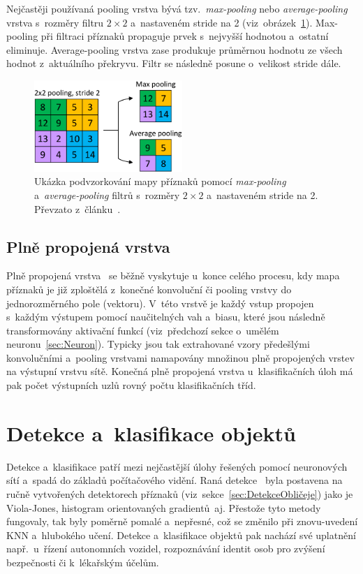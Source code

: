 Nejčastěji používaná pooling vrstva bývá tzv.~\emph{max-pooling} nebo \emph{average-pooling} vrstva s~rozměry filtru $2 \times 2$ a~nastaveném stride na 2 (viz~obrázek~\ref{img:pooling}). Max-pooling při filtraci příznaků propaguje prvek s~nejvyšší hodnotou a~ostatní eliminuje. Average-pooling vrstva zase produkuje průměrnou hodnotu ze všech hodnot z~aktuálního překryvu. Filtr se následně posune o~velikost stride dále.

\begin{figure}[hbt]
	\centering
	\setlength{\fboxsep}{0pt}
	\includegraphics[width=0.5\textwidth]{obrazky-figures/pooling.pdf}
	\caption{Ukázka podvzorkování mapy příznaků pomocí \emph{max-pooling} a~\emph{average-pooling} filtrů s~rozměry $2 \times 2$ a~nastaveném stride na 2. Převzato z~článku~\cite{website:CNNOverviewAndApplication}.}
	\label{img:pooling}
\end{figure}

\subsection{Plně propojená vrstva}
Plně propojená vrstva~\cite{website:CNNOverviewAndApplication} se běžně vyskytuje u~konce celého procesu, kdy mapa příznaků je již zploštělá z~konečné konvoluční či pooling vrstvy do jednorozměrného pole (vektoru). V~této vrstvě je každý vstup propojen s~každým výstupem pomocí naučitelných vah a~biasu, které jsou následně transformovány aktivační funkcí (viz~předchozí sekce o~umělém neuronu~\ref{sec:Neuron}). Typicky jsou tak extrahované vzory předešlými konvolučními a~pooling vrstvami namapovány množinou plně propojených vrstev na výstupní vrstvu sítě. Konečná plně propojená vrstva u~klasifikačních úloh má pak počet výstupních uzlů rovný počtu klasifikačních tříd.

\section{Detekce a~klasifikace objektů}
Detekce a~klasifikace patří mezi nejčastější úlohy řešených pomocí neuronových sítí a~spadá do základů počítačového vidění. Raná detekce~\cite{article:SurveyOfObjectDetection} byla postavena na ručně vytvořených detektorech příznaků (viz~sekce~\ref{sec:DetekceObličeje}) jako je Viola-Jones, histogram orientovaných gradientů~aj. Přestože tyto metody fungovaly, tak byly poměrně pomalé a~nepřesné, což se změnilo při znovu-uvedení KNN a~hlubokého učení. Detekce a~klasifikace objektů pak nachází své uplatnění např.~u~řízení autonomních vozidel, rozpoznávání identit osob pro zvýšení bezpečnosti či k~lékařským účelům.

